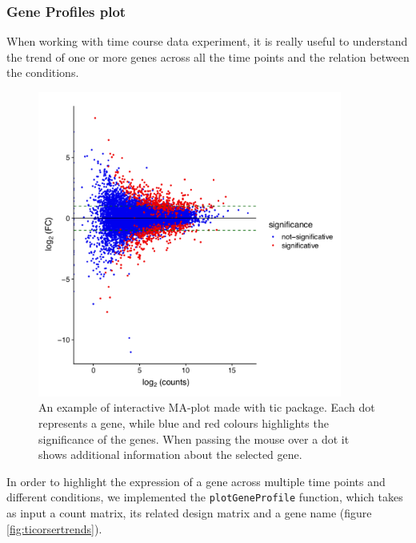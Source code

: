 \subsubsection{Gene Profiles plot}
When working with time course data experiment, it is really useful to understand the trend of one or more genes across all the time points and the relation between the conditions.


\begin{figure}[H]
\centering
\includegraphics[width=10cm,keepaspectratio]{img/ticorser/maplot.pdf}
\caption[\gls{tic} MAplot]{An example of interactive MA-plot made with \gls{tic} package. Each dot represents a gene, while blue and red colours highlights the significance of the genes. When passing the mouse over a dot it shows additional information about the selected gene.}
\label{fig:ticorsermaplot}
\end{figure}


In order to highlight the expression of a gene across multiple time points and different conditions, we implemented the \lstinline!plotGeneProfile! function, which takes as input a count matrix, its related design matrix and a gene name (figure \ref{fig:ticorsertrends}).

